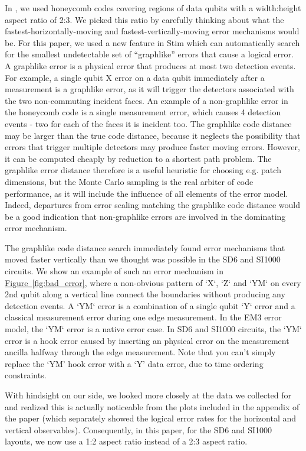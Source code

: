\documentclass[onecolumn,unpublished,a4paper]{quantumarticle}
\theoremstyle{definition}
\theoremstyle{definition}
\theoremstyle{definition}
\newcommand{\fig}[1]{\hyperref[fig:#1]{Figure~\ref*{fig:#1}}}
\begin{document}
In \cite{gidney2021honeycombmemory}, we used honeycomb codes covering regions of data qubits with a width:height aspect ratio of 2:3.
We picked this ratio by carefully thinking about what the fastest-horizontally-moving and fastest-vertically-moving error mechanisms would be.
For this paper, we used a new feature in Stim which can automatically search for the smallest undetectable set of ``graphlike'' errors that cause a logical error.
A graphlike error is a physical error that produces at most two detection events.
For example, a single qubit X error on a data qubit immediately after a measurement is a graphlike error, as it will trigger the detectors associated with the two non-commuting incident faces. An example of a non-graphlike error in the honeycomb code is a single measurement error, which causes 4 detection events - two for each of the faces it is incident too.  
The graphlike code distance may be larger than the true code distance, because it neglects the possibility that errors that trigger multiple detectors may produce faster moving errors. However, it can be computed cheaply by reduction to a shortest path problem. The graphlike error distance therefore is a useful heuristic for choosing e.g. patch dimensions, but the Monte Carlo sampling is the real arbiter of code performance, as it will include the influence of all elements of the error model. Indeed, departures from error scaling matching the graphlike code distance would be a good indication that non-graphlike errors are involved in the dominating error mechanism.

The graphlike code distance search immediately found error mechanisms that moved faster vertically than we thought was possible in the SD6 and SI1000 circuits. We show an example of such an error mechanism in \fig{bad_error}, where a non-obvious pattern of `X`, `Z` and `YM` on every 2nd qubit along a vertical line connect the boundaries without producing any detection events. A `YM` error is a combination of a single qubit `Y` error and a classical measurement error during one edge measurement. In the EM3 error model, the `YM` error is a native error case. In SD6 and SI1000 circuits, the `YM` error is a hook error caused by inserting an physical error on the measurement ancilla halfway through the edge measurement. 
Note that you can't simply replace the `YM' hook error with a `Y' data error, due to time ordering constraints.

With hindsight on our side, we looked more closely at the data we collected for \cite{gidney2021honeycombmemory} and realized this is actually noticeable from the plots included in the appendix of the paper (which separately showed the logical error rates for the horizontal and vertical observables).
Consequently, in this paper, for the SD6 and SI1000 layouts, we now use a 1:2 aspect ratio instead of a 2:3 aspect ratio.
\end{document}
